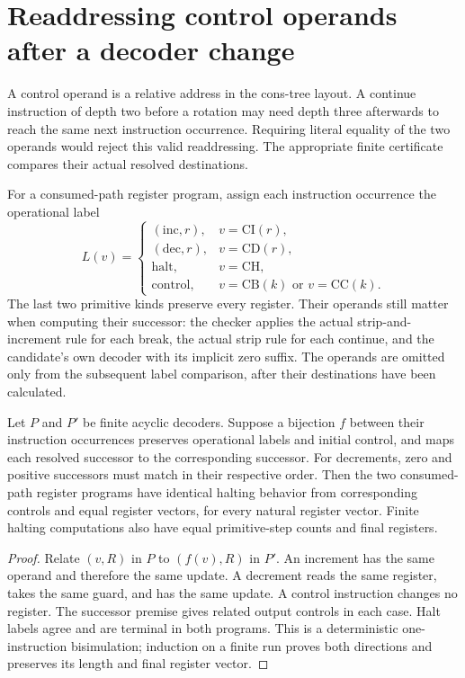 \section{Readdressing control operands after a decoder change}
\label{sec:control-readdressing}

A control operand is a relative address in the cons-tree layout.  A
continue instruction of depth two before a rotation may need depth three
afterwards to reach the same next instruction occurrence.  Requiring
literal equality of the two operands would reject this valid
readdressing.  The appropriate finite certificate compares their actual
resolved destinations.

For a consumed-path register program, assign each instruction occurrence
the operational label
\[
 L(v)=\begin{cases}
  (\mathrm{inc},r),&v=\mathrm{CI}(r),\\
  (\mathrm{dec},r),&v=\mathrm{CD}(r),\\
  \mathrm{halt},&v=\mathrm{CH},\\
  \mathrm{control},&v=\mathrm{CB}(k)\text{ or }v=\mathrm{CC}(k).
 \end{cases}
\]
The last two primitive kinds preserve every register.  Their operands
still matter when computing their successor: the checker applies the
actual strip-and-increment rule for each break, the actual strip rule
for each continue, and the candidate's own decoder with its implicit
zero suffix.  The operands are omitted only from the subsequent label
comparison, after their destinations have been calculated.

\begin{theorem}
Let $P$ and $P'$ be finite acyclic decoders.  Suppose a bijection $f$
between their instruction occurrences preserves operational labels and
initial control, and maps each resolved successor to the corresponding
successor.  For decrements, zero and positive successors must match in
their respective order.  Then the two consumed-path register programs
have identical halting behavior from corresponding controls and equal
register vectors, for every natural register vector.  Finite halting
computations also have equal primitive-step counts and final registers.
\end{theorem}
\begin{proof}
Relate $(v,R)$ in $P$ to $(f(v),R)$ in $P'$.  An increment has the same
operand and therefore the same update.  A decrement reads the same
register, takes the same guard, and has the same update.  A control
instruction changes no register.  The successor premise gives related
output controls in each case.  Halt labels agree and are terminal in
both programs.  This is a deterministic one-instruction bisimulation;
induction on a finite run proves both directions and preserves its
length and final register vector.
\end{proof}

